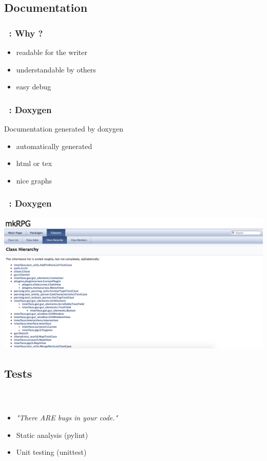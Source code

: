 \documentclass[11pt]{beamer}
\begin{document}
\subsection{Documentation}
\begin{frame}
    \frametitle{\secname~: Why ?}
    \begin{itemize}
        \item readable for the writer
        \item understandable by others 
        \item easy debug
    \end{itemize}
\end{frame}

\begin{frame}
    \frametitle{\secname~: Doxygen}
    Documentation generated by doxygen
    \begin{itemize}
    	\item automatically generated
        \item html or tex
        \item nice graphs
    \end{itemize}
\end{frame}

\begin{frame}
    \frametitle{\secname~: Doxygen}
\includegraphics[scale=0.3]{doxygen}
\end{frame}

\subsection{Tests}
\begin{frame}
    \frametitle{\secname~}
    \begin{itemize}
    	\item \textit{"There ARE bugs in your code."}
        \item Static analysis (pylint)
        \item Unit testing (unittest)
    \end{itemize}
\end{frame}
\end{document}
